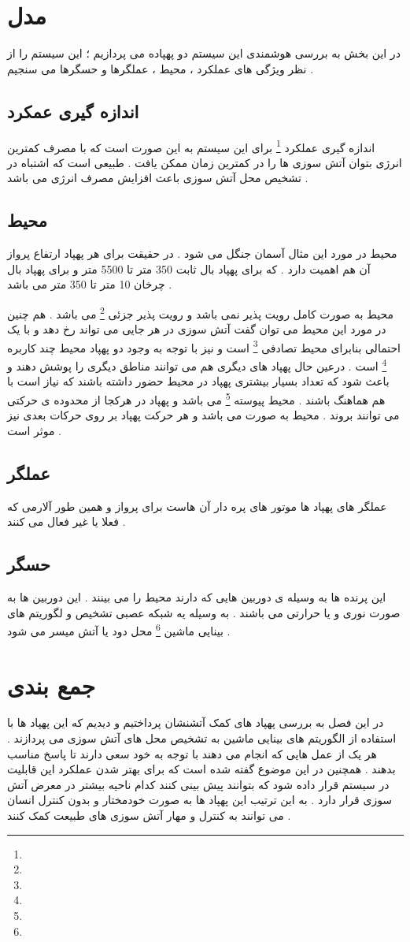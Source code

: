 \section{مدل} 
در این بخش به بررسی هوشمندی این سیستم دو پهپاده می پردازیم ؛ این سیستم را از نظر ویژگی های عملکرد ،  محیط ، عملگرها و حسگرها می سنجیم .
\subsection{اندازه گیری عمکرد} 
اندازه گیری عملکرد
\footnote{}
برای این سیستم به این صورت است که با مصرف کمترین انرژی بتوان آتش سوزی ها را در کمترین زمان ممکن یافت . طبیعی است که اشتباه در تشخیص محل آتش سوزی باعث افزایش مصرف انرژی می باشد .
\subsection{محیط}
محیط در مورد این مثال آسمان  جنگل می شود . در حقیقت برای هر پهپاد ارتفاع پرواز آن هم اهمیت دارد . که برای پهپاد  بال ثابت 350 متر تا 5500 متر و برای پهپاد بال چرخان 10 متر تا 350 متر می باشد . 
\par 
محیط به صورت کامل رویت پذیر نمی باشد و رویت پذیر جزئی 
\footnote{}
می باشد . هم چنین در مورد این محیط می توان گفت آتش سوزی در هر جایی می تواند رخ دهد و با یک احتمالی بنابرای محیط تصادفی
\footnote{}
است و نیز با توجه به وجود دو پهپاد محیط چند کاربره
\footnote{}
است . درعین حال پهپاد های دیگری هم می توانند مناطق دیگری را پوشش دهند و باعث شود که تعداد بسیار بیشتری پهپاد در محیط حضور داشته باشند که نیاز است با هم هماهنگ باشند . محیط پیوسته
\footnote{}
می باشد و پهپاد در هرکجا از محدوده ی حرکتی می توانند بروند .
محیط به صورت 
 می باشد و هر حرکت پهپاد بر روی حرکات بعدی نیز موثر است .

\subsection{عملگر}
عملگر های پهپاد ها موتور های پره دار آن هاست برای پرواز و همین طور آلارمی که فعلا یا غیر فعال می کنند .
\subsection{حسگر}
این پرنده ها به وسیله ی دوربین هایی که دارند محیط را می بینند . این دوربین ها به صورت نوری و یا حرارتی می باشند . به وسیله یه شبکه عصبی تشخیص و لگوریتم های بینایی ماشین
\footnote{}
محل دود یا آتش  میسر می شود .
\section{جمع بندی}
در این فصل به بررسی پهپاد های کمک آتشنشان پرداختیم و دیدیم که این پهپاد ها با استفاده از الگوریتم های بینایی ماشین به تشخیص محل های آتش سوزی می پردازند . هر یک از عمل هایی که انجام می دهند با توجه به 
خود سعی دارند تا پاسخ مناسب بدهند . همچنین در 
\cite{kinaneva2019early}
این موضوع گفته شده است که برای بهتر شدن عملکرد این قابلیت در سیستم قرار داده شود که بتوانند پیش بینی کنند کدام ناحیه بیشتر در معرض آتش سوزی قرار دارد . به این ترتیب این پهپاد ها به صورت خودمختار و بدون کنترل انسان می توانند به کنترل و مهار آتش سوزی های طبیعت کمک کنند .
